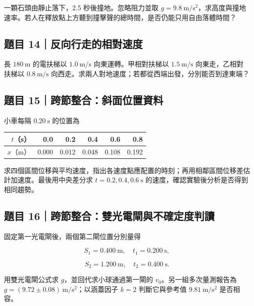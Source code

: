 \documentclass[11pt,a4paper]{article}
\newcounter{none}
\begin{document}
一顆石頭由靜止落下，2.5 秒後撞地。忽略阻力並取 \(g=9.8\ \mathrm{m/s^2}\)，求高度與撞地速率。若人在釋放點上方聽到撞擊聲的總時間，是否仍能只用自由落體時間？

\subsection{題目 14｜反向行走的相對速度}\label{ux984cux76ee-14ux53cdux5411ux884cux8d70ux7684ux76f8ux5c0dux901fux5ea6}

長 \(180\ \mathrm m\) 的電扶梯以 \(1.0\ \mathrm{m/s}\) 向東運轉。甲相對扶梯以 \(1.5\ \mathrm{m/s}\) 向東走，乙相對扶梯以 \(0.8\ \mathrm{m/s}\) 向西走。求兩人對地速度；若都從西端出發，分別能否到達東端？

\subsection{題目 15｜跨節整合：斜面位置資料}\label{ux984cux76ee-15ux8de8ux7bc0ux6574ux5408ux659cux9762ux4f4dux7f6eux8cc7ux6599}

小車每隔 \(0.20\ \mathrm s\) 的位置為

{\def\LTcaptype{none} %
\begin{longtable}[]{@{}rrrrrr@{}}
\toprule\noalign{}
\(t\)（s） & 0.0 & 0.2 & 0.4 & 0.6 & 0.8 \\
\midrule\noalign{}
\endhead
\bottomrule\noalign{}
\endlastfoot
\(x\)（m） & 0.000 & 0.012 & 0.048 & 0.108 & 0.192 \\
\end{longtable}
}

求四個區間位移與平均速度，指出各速度點應配置的時刻；再用相鄰區間位移差估計加速度。最後用中央差分求 \(t=0.2,0.4,0.6\ \mathrm s\) 的速度，確認實驗後分析是否得到相同趨勢。

\subsection{題目 16｜跨節整合：雙光電閘與不確定度判讀}\label{ux984cux76ee-16ux8de8ux7bc0ux6574ux5408ux96d9ux5149ux96fbux9598ux8207ux4e0dux78baux5b9aux5ea6ux5224ux8b80}

固定第一光電閘後，兩個第二閘位置分別量得

\[
S_1=0.400\ \mathrm m,\quad t_1=0.200\ \mathrm s,
\]

\[
S_2=1.200\ \mathrm m,\quad t_2=0.400\ \mathrm s.
\]

用雙光電閘公式求 \(g\)，並回代求小球通過第一閘的 \(v_0\)。另一組多次量測報告為 \(g=(9.72\pm0.08)\ \mathrm{m/s^2}\)；以涵蓋因子 \(k=2\) 判斷它與參考值 \(9.81\ \mathrm{m/s^2}\) 是否相容。
\end{document}
